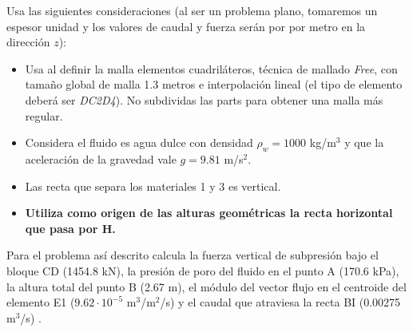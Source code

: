 Usa las siguientes
consideraciones (al ser un problema plano, tomaremos un espesor unidad
y los valores de caudal y fuerza serán por por metro en la dirección $z$):
\begin{itemize}
\item Usa al definir la malla elementos cuadriláteros, técnica de
  mallado \textit{Free}, con tamaño global de malla 1.3 metros e
  interpolación lineal (el tipo de elemento deberá ser \textit{DC2D4}). No subdividas las
  parts para obtener una malla más regular.
\item Considera el fluido es agua dulce con densidad $\rho_w=1000$
  kg/m$^3$ y que la aceleración de la gravedad vale $g=9.81$ m/s$^2$.
\item Las recta que separa los materiales 1 y 3 es vertical.
\item \textbf{Utiliza como origen de las alturas geométricas la recta horizontal
    que pasa por H.}
\end{itemize}

Para el problema así descrito calcula la fuerza vertical de subpresión bajo el bloque CD (1454.8 kN), la presión de poro del fluido en el punto A (170.6 kPa), la altura total del punto B (2.67 m), el módulo del vector flujo en el centroide del elemento E1 ($9.62\cdot 10^{-5}$ m$^3$/m$^2$/s) y el caudal que atraviesa la recta BI (0.00275 m$^3$/s) .